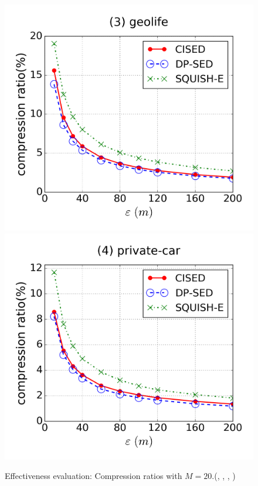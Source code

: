 \begin{figure}[tb!]
\includegraphics[scale = 0.250]{figures/Exp-cr-epsilon-geolife.png}
\includegraphics[scale = 0.250]{figures/Exp-cr-epsilon-private.png}
\vspace{-3ex}
\caption{\small Effectiveness evaluation: Compression ratios with $M=20$.(\cist, \cista, \dpa, \squishe)}
\label{fig:cr-m20}
\vspace{-1.0ex}
\end{figure}

